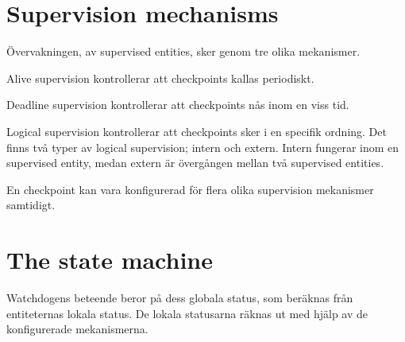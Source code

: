 \documentclass[a4paper]{article}
\begin{document}



\section{Supervision mechanisms}
Övervakningen, av supervised entities, sker genom tre olika mekanismer.

Alive supervision kontrollerar att checkpoints kallas periodiskt.

Deadline supervision kontrollerar att checkpoints nås inom en viss
tid.

Logical supervision kontrollerar att checkpoints sker i en specifik
ordning. Det finns två typer av logical supervision; intern och
extern. Intern fungerar inom en supervised entity, medan extern är
övergången mellan två supervised entities.

En checkpoint kan vara konfigurerad för flera olika supervision
mekanismer samtidigt.





\section{The state machine}
Watchdogens beteende beror på dess globala status, som beräknas från
entiteternas lokala status. De lokala statusarna räknas ut med hjälp av de
konfigurerade mekanismerna.


\end{document}
